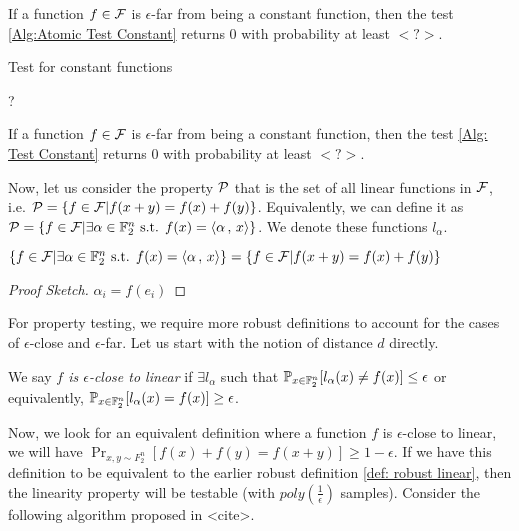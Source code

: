 \begin{lemma}
    If a function $f \in \mathcal{F}$ is $\epsilon$-far from being a constant function, then the test \ref{Alg:Atomic Test Constant} returns $0$ with probability at least $<?>$.
\end{lemma}

\begin{algorithm}
    \caption{Test for constant functions}\label{Alg: Test Constant}
    \begin{algorithmic}
        \State ?
    \end{algorithmic}
\end{algorithm}

\begin{theorem}
    If a function $f \in \mathcal{F}$ is $\epsilon$-far from being a constant function, then the test \ref{Alg: Test Constant} returns 0 with probability at least $<?>$.
\end{theorem}


Now, let us consider the property $\mathcal{P}$ that is the set of all linear functions in $\mathcal{F}$, i.e. $\mathcal{P} = \{f \in \mathcal{F}| f(x+y) = f(x)+f(y)\}$. Equivalently, we can define it as $\mathcal{P} = \{f \in \mathcal{F}| \exists \alpha \in \mathbb{F}_2^n\text{ s.t. }f(x) = \left\langle {\alpha} \,,\, {x} \right\rangle \}$. We denote these functions $l_\alpha$.

\begin{lemma}
    $\{f \in \mathcal{F}| \exists \alpha \in \mathbb{F}_2^n\text{ s.t. }f(x) = \left\langle {\alpha} \,,\, {x} \right\rangle \} = \{f \in \mathcal{F}| f(x+y) = f(x)+f(y)\}$

    \begin{proof}[Proof Sketch]
        $\alpha_i = f(e_i)$
    \end{proof}
\end{lemma}

For property testing, we require more robust definitions to account for the cases of $\epsilon$-close and $\epsilon$-far. Let us start with the notion of distance $d$ directly. 
\begin{definition}\label{def: robust linear}
    We say \emph{$f$ is $\epsilon$-close to linear} if $\exists l_\alpha$ such that $\mathbb{P}_{x \in \mathbb{F}_2^n} [ l_\alpha(x) \neq f(x) ] \leq \epsilon$ or equivalently, $\mathbb{P}_{x \in \mathbb{F}_2^n} [ l_\alpha(x) = f(x) ] \geq \epsilon$.
\end{definition}


Now, we look for an equivalent definition where a function $f$ is $\epsilon$-close to linear, we will have $\Pr_{x,y \sim F_2^n} [f(x)+f(y) = f(x+y)] \geq 1 - \epsilon$. If we have this definition to be equivalent to the earlier robust definition \ref{def: robust linear}, then the linearity property will be testable (with $poly(\frac{1}{\epsilon})$ samples). Consider the following algorithm proposed in <cite>.

